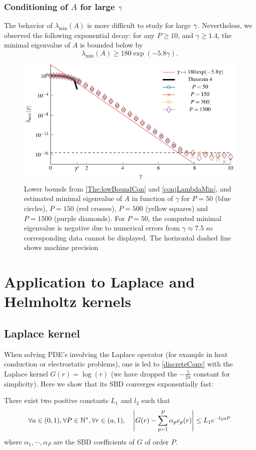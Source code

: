 \documentclass{article}
\begin{document}
\subsubsection*{Conditioning of $A$ for large $\gamma$}																
The behavior of $\lambda_{\min}(A)$ is more difficult to study for large $\gamma$. Nevertheless, we observed the following exponential decay: for any $P \geq 10$, and $\gamma \geq 1.4$, the minimal eigenvalue of $A$ is bounded below by
\begin{equation}
	\label{conjLambdaMin}
	\lambda_{\min}(A) \geq 180 \exp(-5.8\gamma).
\end{equation}
\begin{figure}[H]
	\centering
	\includegraphics[scale = 1]{LambdaMinAsympt}
	\caption{Lower bounds from \autoref{The:lowBoundCon} and \autoref{conjLambdaMin}, and estimated minimal eigenvalue of $A$ in function of $\gamma$ for $P=50$ (blue circles), $P=150$ (red crosses), $P=500$ (yellow squares) and $P=1500$ (purple diamonds). For $P=50$, the computed minimal eigenvalue is negative due to numerical errors from $\gamma \approx 7.5$ so corresponding data cannot be displayed. The horizontal dashed line shows machine precision}
\end{figure}


																
\section{Application to Laplace and Helmholtz kernels}
\label{sec:ApplicationLaplaceHelmholtz}
\subsection{Laplace kernel}
When solving PDE's involving the Laplace operator (for example in heat conduction or electrostatic problems), one is led to \eqref{discreteConv} with the Laplace kernel $G(r) = \log(r)$ (we have dropped the $-\frac{1}{2\pi}$ constant for simplicity). Here we show that its SBD converges exponentially fast:
\begin{Theorem} 
	\label{theRadialQuadLaplaceErreur}
	There exist two positive constants $L_1$ and $l_2$ such that
	\[ \forall a \in (0,1), \forall P \in \mathbb{N}^*, \forall r \in (a,1), \quad \left\lvert G(r) - \sum_{p=1}^P \alpha_p e_p(r) \right\rvert \leq L_1 e^{-l_2 a P} \]
	where $\alpha_1,\cdots,\alpha_P$ are the SBD coefficients of $G$ of order $P$.  
\end{Theorem}
																		
\end{document}
